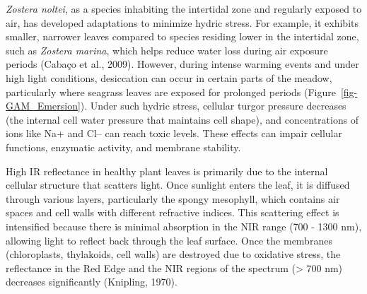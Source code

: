 \documentclass[
  letterpaper,
  11pt,
  english,
  singlespacing,
  headsepline]{MastersDoctoralThesis}
\begin{document}
\begin{spacing}{1.5}
\emph{Zostera noltei}, as a species inhabiting the intertidal zone and
regularly exposed to air, has developed adaptations to minimize hydric
stress. For example, it exhibits smaller, narrower leaves compared to
species residing lower in the intertidal zone, such as \emph{Zostera
marina}, which helps reduce water loss during air exposure periods
(Cabaço et al., 2009). However, during intense warming events and under
high light conditions, desiccation can occur in certain parts of the
meadow, particularly where seagrass leaves are exposed for prolonged
periods (Figure~\ref{fig-GAM_Emersion}). Under such hydric stress,
cellular turgor pressure decreases (the internal cell water pressure
that maintains cell shape), and concentrations of ions like Na+ and Cl--
can reach toxic levels. These effects can impair cellular functions,
enzymatic activity, and membrane stability.

High IR reflectance in healthy plant leaves is primarily due to the
internal cellular structure that scatters light. Once sunlight enters
the leaf, it is diffused through various layers, particularly the spongy
mesophyll, which contains air spaces and cell walls with different
refractive indices. This scattering effect is intensified because there
is minimal absorption in the NIR range (700 - 1300 nm), allowing light
to reflect back through the leaf surface. Once the membranes
(chloroplasts, thylakoids, cell walls) are destroyed due to oxidative
stress, the reflectance in the Red Edge and the NIR regions of the
spectrum (\textgreater{} 700 nm) decreases significantly (Knipling,
1970).


\end{spacing}
\end{document}
